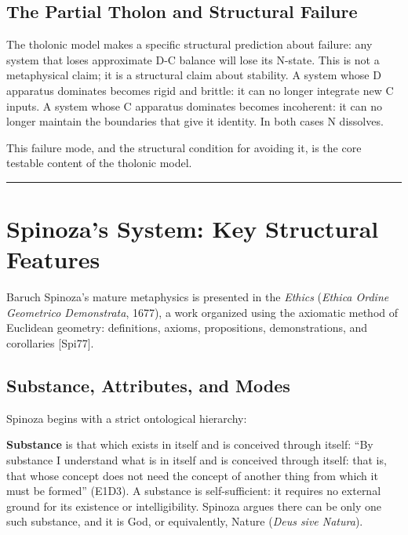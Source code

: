 \documentclass[12pt]{article}
\begin{document}
\subsection{The Partial Tholon and Structural Failure}\label{the-partial-tholon-and-structural-failure}

The tholonic model makes a specific structural prediction about failure:
any system that loses approximate D-C balance will lose its N-state.
This is not a metaphysical claim; it is a structural claim about
stability. A system whose D apparatus dominates becomes rigid and
brittle: it can no longer integrate new C inputs. A system whose C
apparatus dominates becomes incoherent: it can no longer maintain the
boundaries that give it identity. In both cases N dissolves.

This failure mode, and the structural condition for avoiding it, is the
core testable content of the tholonic model.

\begin{center}\rule{0.5\linewidth}{0.5pt}\end{center}

\section{Spinoza's System: Key Structural Features}\label{spinozas-system-key-structural-features}

Baruch Spinoza's mature metaphysics is presented in the \emph{Ethics}
(\emph{Ethica Ordine Geometrico Demonstrata}, 1677), a work organized
using the axiomatic method of Euclidean geometry: definitions, axioms,
propositions, demonstrations, and corollaries {[}Spi77{]}.

\subsection{Substance, Attributes, and Modes}\label{substance-attributes-and-modes}

Spinoza begins with a strict ontological hierarchy:

\textbf{Substance} is that which exists in itself and is conceived
through itself: ``By substance I understand what is in itself and is
conceived through itself: that is, that whose concept does not need the
concept of another thing from which it must be formed'' (E1D3). A
substance is self-sufficient: it requires no external ground for its
existence or intelligibility. Spinoza argues there can be only one such
substance, and it is God, or equivalently, Nature (\emph{Deus sive
Natura}).
\end{document}
